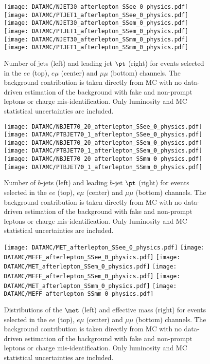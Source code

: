 \begin{figure}[htb!]
\centering
{\texttt{[image: DATAMC/NJET30\_afterlepton\_SSee\_0\_physics.pdf]}}
{\texttt{[image: DATAMC/PTJET1\_afterlepton\_SSee\_0\_physics.pdf]}}
{\texttt{[image: DATAMC/NJET30\_afterlepton\_SSem\_0\_physics.pdf]}}
{\texttt{[image: DATAMC/PTJET1\_afterlepton\_SSem\_0\_physics.pdf]}}
{\texttt{[image: DATAMC/NJET30\_afterlepton\_SSmm\_0\_physics.pdf]}}
{\texttt{[image: DATAMC/PTJET1\_afterlepton\_SSmm\_0\_physics.pdf]}}
\caption{Number of jets (left) and leading jet $\pt$ (right) for events selected in the $ee$ (top), $e\mu$ (center) and $\mu\mu$ (bottom) channels. The background contribution is taken directly from MC with no data-driven estimation of the background with fake and non-prompt leptons or charge mis-identification. Only luminosity and MC statistical uncertainties are included.
}
\label{fig:dataMC_jet}
\end{figure}


\begin{figure}[htb!]
\centering
{\texttt{[image: DATAMC/NBJET70\_20\_afterlepton\_SSee\_0\_physics.pdf]}}
{\texttt{[image: DATAMC/PTBJET70\_1\_afterlepton\_SSee\_0\_physics.pdf]}}
{\texttt{[image: DATAMC/NBJET70\_20\_afterlepton\_SSem\_0\_physics.pdf]}}
{\texttt{[image: DATAMC/PTBJET70\_1\_afterlepton\_SSem\_0\_physics.pdf]}}
{\texttt{[image: DATAMC/NBJET70\_20\_afterlepton\_SSmm\_0\_physics.pdf]}}
{\texttt{[image: DATAMC/PTBJET70\_1\_afterlepton\_SSmm\_0\_physics.pdf]}}
\caption{Number of $b$-jets (left) and leading $b$-jet $\pt$ (right) for events selected in the $ee$ (top), $e\mu$ (center) and $\mu\mu$ (bottom) channels. The background contribution is taken directly from MC with no data-driven estimation of the background with fake and non-prompt leptons or charge mis-identification. Only luminosity and MC statistical uncertainties are included.
}
\label{fig:dataMC_bjet}
\end{figure}


\begin{figure}[htb!]
\centering
{\texttt{[image: DATAMC/MET\_afterlepton\_SSee\_0\_physics.pdf]}}
{\texttt{[image: DATAMC/MEFF\_afterlepton\_SSee\_0\_physics.pdf]}}
{\texttt{[image: DATAMC/MET\_afterlepton\_SSem\_0\_physics.pdf]}}
{\texttt{[image: DATAMC/MEFF\_afterlepton\_SSem\_0\_physics.pdf]}}
{\texttt{[image: DATAMC/MET\_afterlepton\_SSmm\_0\_physics.pdf]}}
{\texttt{[image: DATAMC/MEFF\_afterlepton\_SSmm\_0\_physics.pdf]}}
\caption{Distributions of the $\met$ (left) and effective mass (right) for events selected in the $ee$ (top), $e\mu$ (center) and $\mu\mu$ (bottom) channels. The background contribution is taken directly from MC with no data-driven estimation of the background with fake and non-prompt leptons or charge mis-identification. Only luminosity and MC statistical uncertainties are included.
}
\label{fig:dataMC_metmeff}
\end{figure}

\FloatBarrier

